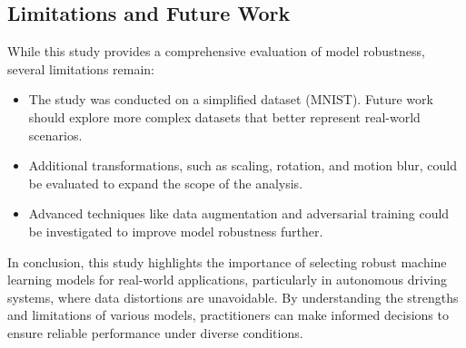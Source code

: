 \documentclass{article}
\begin{document}
\subsection*{Limitations and Future Work}
While this study provides a comprehensive evaluation of model robustness, several limitations remain:
\begin{itemize}
    \item The study was conducted on a simplified dataset (MNIST). Future work should explore more complex datasets that better represent real-world scenarios.
    \item Additional transformations, such as scaling, rotation, and motion blur, could be evaluated to expand the scope of the analysis.
    \item Advanced techniques like data augmentation and adversarial training could be investigated to improve model robustness further.
\end{itemize}


In conclusion, this study highlights the importance of selecting robust machine learning models for real-world applications, particularly in autonomous driving systems, where data distortions are unavoidable. By understanding the strengths and limitations of various models, practitioners can make informed decisions to ensure reliable performance under diverse conditions.
\end{document}
